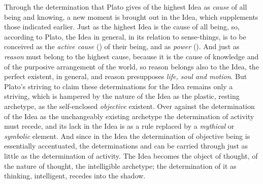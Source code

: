 Through the determination that Plato gives of the highest Idea
as \emph{cause} of all being and knowing, a new moment
is brought out in the Idea, which supplements those indicated earlier. Just as the highest Idea is the cause of all being, so, according to
Plato, the Idea in general, in its relation to sense-things,
is to be conceived as the \emph{active cause} () of their
being, and as \emph{power} (). And just as \emph{reason} must belong to the highest cause, because it is the cause of
knowledge and of the purposive arrangement of the world, so reason belongs also to the Idea, the perfect existent, in general, and reason presupposes \emph{life, soul and motion}.
But Plato's striving to claim these determinations for the Idea
remains only a striving, which is hampered by the nature of the Idea as
the plastic, resting archetype, as the self-enclosed
\emph{objective} existent. Over against the determination of the Idea as
the unchangeably existing archetype the determination of
activity must recede, and its lack in the Idea is as
a rule replaced by a \emph{mythical} or \emph{symbolic} element. And since
in the Idea the determination of objective being is essentially accentuated, the determinations  and  can be carried through just as little
as the determination of activity. The Idea becomes
the object of thought, of the nature of thought, the intelligible archetype;
the determination of it as thinking, intelligent, recedes into the shadow.

\divrule

